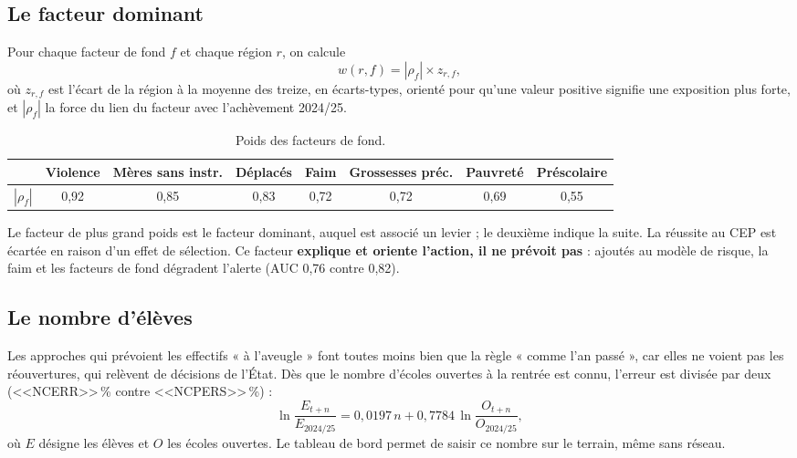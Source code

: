 \documentclass[11pt,a4paper]{article}
\begin{document}
\subsection{Le facteur dominant}
Pour chaque facteur de fond $f$ et chaque région $r$, on calcule
\begin{equation}
w(r,f) = |\rho_f| \times z_{r,f},
\end{equation}
où $z_{r,f}$ est l'écart de la région à la moyenne des treize, en écarts-types, orienté pour qu'une valeur positive signifie une exposition plus forte, et $|\rho_f|$ la force du lien du facteur avec l'achèvement 2024/25.
\begin{table}[H]\centering\small
\begin{tabular}{@{}lccccccc@{}}\toprule
 & Violence & Mères sans instr. & Déplacés & Faim & Grossesses préc. & Pauvreté & Préscolaire\\\midrule
$|\rho_f|$ & 0,92 & 0,85 & 0,83 & 0,72 & 0,72 & 0,69 & 0,55\\\bottomrule
\end{tabular}\caption{Poids des facteurs de fond.}\end{table}
Le facteur de plus grand poids est le facteur dominant, auquel est associé un levier ; le deuxième indique la suite. La réussite au CEP est écartée en raison d'un effet de sélection. Ce facteur \textbf{explique et oriente l'action, il ne prévoit pas} : ajoutés au modèle de risque, la faim et les facteurs de fond dégradent l'alerte (AUC 0,76 contre 0,82).

\subsection{Le nombre d'élèves}
Les approches qui prévoient les effectifs « à l'aveugle » font toutes moins bien que la règle « comme l'an passé », car elles ne voient pas les réouvertures, qui relèvent de décisions de l'État. Dès que le nombre d'écoles ouvertes à la rentrée est connu, l'erreur est divisée par deux (<<NCERR>>\,\% contre <<NCPERS>>\,\%) :
\begin{equation}
\ln\frac{E_{t+n}}{E_{2024/25}} = 0{,}0197\,n + 0{,}7784\,\ln\frac{O_{t+n}}{O_{2024/25}},
\end{equation}
où $E$ désigne les élèves et $O$ les écoles ouvertes. Le tableau de bord permet de saisir ce nombre sur le terrain, même sans réseau.
\end{document}
